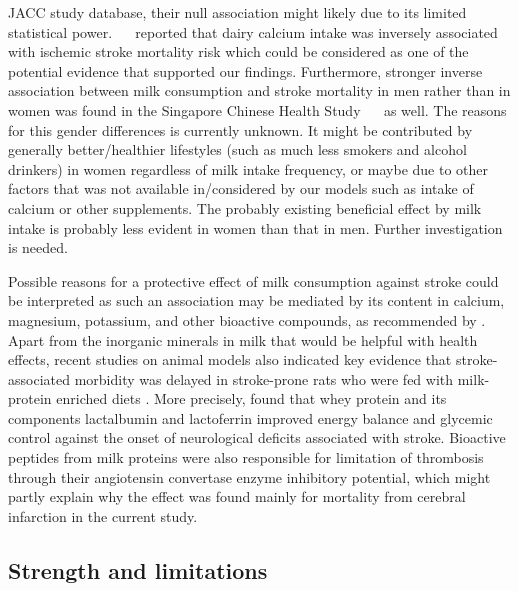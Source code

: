 \documentclass[nutrients,article,submitted,moreauthors,pdftex]{Definitions/mdpi}
\providecommand{\DIFaddbegin}{} %
\providecommand{\DIFaddend}{} %
\newcommand{\DIFaddincludegraphics}[2][]{{\color{blue}\fbox{\DIFOincludegraphics[#1]{#2}}}} %
\DeclareRobustCommand{\DIFaddbegin}{\DIFOaddbegin \let\includegraphics\DIFaddincludegraphics} %
\DeclareRobustCommand{\DIFaddend}{\DIFOaddend \let\includegraphics\DIFOincludegraphics} %
\begin{document}
{{{JACC study database, their null association might likely due to its
limited statistical power. \mbox{%
\citet{umesawa2008dietary} }\hspace{0pt}%
reported that
dairy calcium intake was inversely associated with ischemic stroke
mortality risk which could be considered as one of the potential
evidence that supported our findings. Furthermore, stronger inverse
association between milk consumption and stroke mortality in men rather
than in women was found in the Singapore Chinese Health Study
\mbox{%
\citep{Talaei_2016} }\hspace{0pt}%
as well. The reasons for this gender differences is
currently unknown. It might be contributed by generally better/healthier
lifestyles (such as much less smokers and alcohol drinkers) in women
regardless of milk intake frequency, or maybe due to other factors that
was not available in/considered by our models such as intake of calcium
or other supplements. The probably existing beneficial effect by milk
intake is probably less evident in women than that in men. Further
investigation is needed.
}\DIFaddend 

Possible reasons for a protective effect of milk consumption against
stroke could be interpreted as such an association may be mediated by
its content in calcium, magnesium, potassium, and other bioactive
compounds, as recommended by \citet{Iacoviello2018}. Apart from the
inorganic minerals in milk that would be helpful with health effects,
recent studies on animal models also indicated key evidence that
stroke-associated morbidity was delayed in stroke-prone rats who were
fed with milk-protein enriched diets \citep{Chiba2012, singh2016diets}.
More precisely, \citet{Singh2020} found that whey protein and its
components lactalbumin and lactoferrin improved energy balance and
glycemic control against the onset of neurological deficits associated
with stroke. Bioactive peptides from milk proteins were also responsible
for limitation of thrombosis \citep{tokajuk2019whey} through their
angiotensin convertase enzyme inhibitory potential, which might partly
explain why the effect was found mainly for mortality from cerebral
infarction in the current study.

\DIFaddbegin \hypertarget{strength-and-limitations}{%
\subsection{Strength and limitations}\label{strength-and-limitations}}

}}
\end{document}
